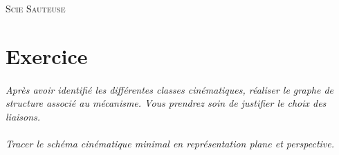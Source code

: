 \documentclass[11pt,oneside]{article}
\begin{document}
\pagestyle{fancy}
\renewcommand{\headrulewidth}{0pt}

\fancyhead{}

\fancyhead[C]{\rule{11cm}{.5pt}}


\renewcommand{\footrulewidth}{0.2pt}

\fancyfoot[C]{\footnotesize{\bfseries \thepage}}



\begin{center}
 \Large\textsc{Scie Sauteuse} 
\end{center}
\vspace{.5cm}





\section*{Exercice}

\paragraph{}
\textit{Après avoir identifié les différentes classes cinématiques, réaliser le graphe de structure associé au mécanisme. Vous prendrez soin de justifier le choix des liaisons.}



\paragraph{}
\textit{Tracer le schéma cinématique minimal en représentation plane et perspective.}
\end{document}
